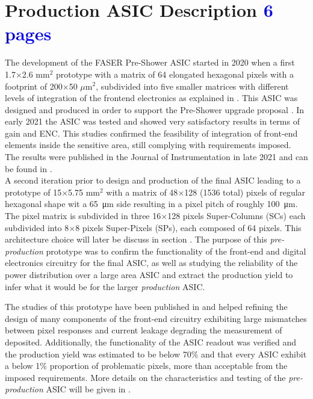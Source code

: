 	\section{Production ASIC Description  \textcolor{blue}{ 6 pages}}
	The development of the FASER Pre-Shower ASIC started in 2020 when a first 1.7$\times$2.6 mm$^2$ prototype with a matrix of 64 elongated hexagonal pixels with a footprint of 200$\times$50 $\mu$m$^2$, subdivided into five smaller matrices with different levels of integration of the frontend electronics as explained in \cite{FASER_proto0}. This ASIC was designed and produced in order to support the Pre-Shower upgrade proposal . In early 2021 the ASIC was tested and showed very satisfactory results in terms of gain and ENC. This studies confirmed the feasibility of integration of front-end elements inside the sensitive area, still complying with requirements imposed. The results were published in the Journal of Instrumentation in late 2021 and can be found in \cite{FASER_proto0}. \\
	
	A second iteration prior to design and production of the final ASIC leading to a prototype of 15$\times$5.75 mm$^2$ with a matrix of 48$\times$128 (1536 total) pixels of regular hexagonal shape wit a \SI{65}{\micro\meter} side resulting in a pixel pitch of roughly \SI{100}{\micro\meter}. The pixel matrix is subdivided in three 16$\times$128 pixels Super-Columns (SCs) each subdivided into 8$\times$8 pixels Super-Pixels (SPs), each composed of 64 pixels. This architecture choice will later be discuss in section . The purpose of this \textit{pre-production} prototype was to confirm the functionality of the front-end and digital electronics circuitry for the final ASIC, as well as studying the reliability of the power distribution over a large area ASIC and extract the production yield to infer what it would be for the larger \textit{production} ASIC. 
	
	The studies of this prototype have been published in  and helped refining the design of many components of the front-end circuitry 	exhibiting large mismatches between pixel responses and current leakage degrading the measurement of deposited. Additionally, the functionality of the ASIC readout was verified and the production yield was estimated to be below 70\% and that every ASIC exhibit a below 1\% proportion of problematic pixels, more than acceptable from the imposed requirements. More details on the characteristics and testing of the \textit{pre-production} ASIC will be given in . \\
	
